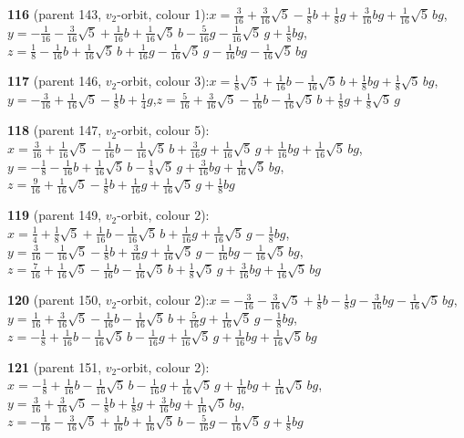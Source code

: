\documentclass[10pt]{article}
\begin{document}
{\noindent\textbf{116} (parent 143, $v_2$-orbit, colour 1):\quad $x=\tfrac{3}{16}+\tfrac{3}{16}\sqrt5-\tfrac{1}{8}b+\tfrac{1}{8}g+\tfrac{3}{16}bg+\tfrac{1}{16}\sqrt5\,bg$,\quad $y=-\tfrac{1}{16}-\tfrac{3}{16}\sqrt5+\tfrac{1}{16}b+\tfrac{1}{16}\sqrt5\,b-\tfrac{5}{16}g-\tfrac{1}{16}\sqrt5\,g+\tfrac{1}{8}bg$,\quad $z=\tfrac{1}{8}-\tfrac{1}{16}b+\tfrac{1}{16}\sqrt5\,b+\tfrac{1}{16}g-\tfrac{1}{16}\sqrt5\,g-\tfrac{1}{16}bg-\tfrac{1}{16}\sqrt5\,bg$\par\smallskip
\noindent\textbf{117} (parent 146, $v_2$-orbit, colour 3):\quad $x=\tfrac{1}{8}\sqrt5+\tfrac{1}{16}b-\tfrac{1}{16}\sqrt5\,b+\tfrac{1}{8}bg+\tfrac{1}{8}\sqrt5\,bg$,\quad $y=-\tfrac{3}{16}+\tfrac{1}{16}\sqrt5-\tfrac{1}{8}b+\tfrac{1}{4}g$,\quad $z=\tfrac{5}{16}+\tfrac{3}{16}\sqrt5-\tfrac{1}{16}b-\tfrac{1}{16}\sqrt5\,b+\tfrac{1}{8}g+\tfrac{1}{8}\sqrt5\,g$\par\smallskip
\noindent\textbf{118} (parent 147, $v_2$-orbit, colour 5):\quad $x=\tfrac{3}{16}+\tfrac{1}{16}\sqrt5-\tfrac{1}{16}b-\tfrac{1}{16}\sqrt5\,b+\tfrac{3}{16}g+\tfrac{1}{16}\sqrt5\,g+\tfrac{1}{16}bg+\tfrac{1}{16}\sqrt5\,bg$,\quad $y=-\tfrac{1}{8}-\tfrac{1}{16}b+\tfrac{1}{16}\sqrt5\,b-\tfrac{1}{8}\sqrt5\,g+\tfrac{3}{16}bg+\tfrac{1}{16}\sqrt5\,bg$,\quad $z=\tfrac{9}{16}+\tfrac{1}{16}\sqrt5-\tfrac{1}{8}b+\tfrac{1}{16}g+\tfrac{1}{16}\sqrt5\,g+\tfrac{1}{8}bg$\par\smallskip
\noindent\textbf{119} (parent 149, $v_2$-orbit, colour 2):\quad $x=\tfrac{1}{4}+\tfrac{1}{8}\sqrt5+\tfrac{1}{16}b-\tfrac{1}{16}\sqrt5\,b+\tfrac{1}{16}g+\tfrac{1}{16}\sqrt5\,g-\tfrac{1}{8}bg$,\quad $y=\tfrac{3}{16}-\tfrac{1}{16}\sqrt5-\tfrac{1}{8}b+\tfrac{3}{16}g+\tfrac{1}{16}\sqrt5\,g-\tfrac{1}{16}bg-\tfrac{1}{16}\sqrt5\,bg$,\quad $z=\tfrac{7}{16}+\tfrac{1}{16}\sqrt5-\tfrac{1}{16}b-\tfrac{1}{16}\sqrt5\,b+\tfrac{1}{8}\sqrt5\,g+\tfrac{3}{16}bg+\tfrac{1}{16}\sqrt5\,bg$\par\smallskip
\noindent\textbf{120} (parent 150, $v_2$-orbit, colour 2):\quad $x=-\tfrac{3}{16}-\tfrac{3}{16}\sqrt5+\tfrac{1}{8}b-\tfrac{1}{8}g-\tfrac{3}{16}bg-\tfrac{1}{16}\sqrt5\,bg$,\quad $y=\tfrac{1}{16}+\tfrac{3}{16}\sqrt5-\tfrac{1}{16}b-\tfrac{1}{16}\sqrt5\,b+\tfrac{5}{16}g+\tfrac{1}{16}\sqrt5\,g-\tfrac{1}{8}bg$,\quad $z=-\tfrac{1}{8}+\tfrac{1}{16}b-\tfrac{1}{16}\sqrt5\,b-\tfrac{1}{16}g+\tfrac{1}{16}\sqrt5\,g+\tfrac{1}{16}bg+\tfrac{1}{16}\sqrt5\,bg$\par\smallskip
\noindent\textbf{121} (parent 151, $v_2$-orbit, colour 2):\quad $x=-\tfrac{1}{8}+\tfrac{1}{16}b-\tfrac{1}{16}\sqrt5\,b-\tfrac{1}{16}g+\tfrac{1}{16}\sqrt5\,g+\tfrac{1}{16}bg+\tfrac{1}{16}\sqrt5\,bg$,\quad $y=\tfrac{3}{16}+\tfrac{3}{16}\sqrt5-\tfrac{1}{8}b+\tfrac{1}{8}g+\tfrac{3}{16}bg+\tfrac{1}{16}\sqrt5\,bg$,\quad $z=-\tfrac{1}{16}-\tfrac{3}{16}\sqrt5+\tfrac{1}{16}b+\tfrac{1}{16}\sqrt5\,b-\tfrac{5}{16}g-\tfrac{1}{16}\sqrt5\,g+\tfrac{1}{8}bg$\par\smallskip
}
\end{document}
